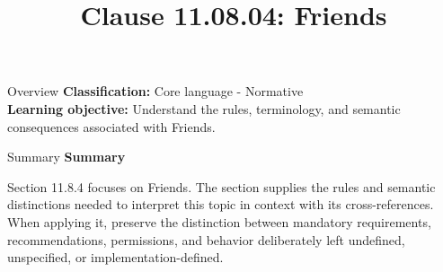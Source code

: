 \documentclass[10pt,letterpaper]{article}
\title{Clause 11.08.04: Friends}
\author{}
\date{}
\begin{document}
\maketitle
\begin{CornellOverviewBox}{Overview}
\textbf{Classification:} Core language - Normative\\[2pt]
\textbf{Learning objective:} Understand the rules, terminology, and semantic consequences associated with Friends.
\end{CornellOverviewBox}\begin{CornellSummaryBox}{Summary}
{\sffamily\bfseries\color{Accent} Summary}\par\vspace{3pt}Section 11.8.4 focuses on Friends. The section supplies the rules and semantic distinctions needed to interpret this topic in context with its cross-references. When applying it, preserve the distinction between mandatory requirements, recommendations, permissions, and behavior deliberately left undefined, unspecified, or implementation-defined.
\end{CornellSummaryBox}
\end{document}
